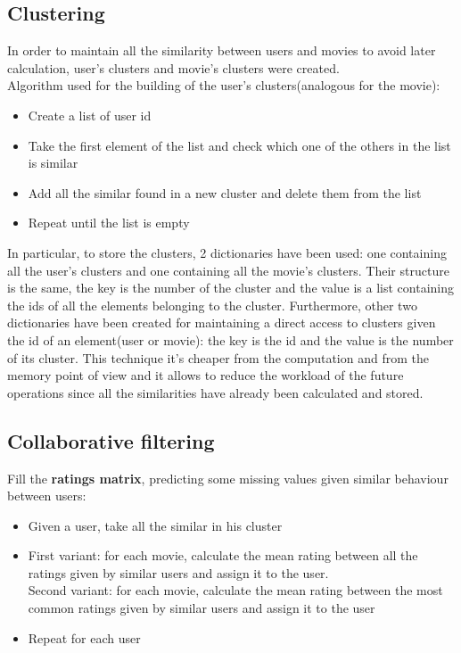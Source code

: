 \documentclass{article}
\begin{document}
\subsection{Clustering}
In order to maintain all the similarity between users and movies to avoid later calculation, user's clusters and movie's clusters were created.\\
Algorithm used for the building of the user's clusters(analogous for the movie):
\begin{itemize}
    \item Create a list of user id
    \item Take the first element of the list and check which one of the others in the list is similar
    \item Add all the similar found in a new cluster and delete them from the list
    \item Repeat until the list is empty
\end{itemize}

\newline
In particular, to store the clusters, 2 dictionaries have been used: one containing all the user's clusters and one containing all the movie's clusters. Their structure is the same, the key is the number of the cluster and the value is a list containing the ids of all the elements belonging to the cluster. Furthermore, other two dictionaries have been created for maintaining a direct access to clusters given the id of an element(user or movie): the key is the id and the value is the number of its cluster. 
\newline
This technique it's cheaper from the computation and from the memory point of view and it allows to reduce the workload of the future operations since all the similarities have already been calculated and stored.


\subsection{Collaborative filtering}
Fill the \textbf{ratings matrix}, predicting some missing values given similar behaviour between users:
\begin{itemize}
    \item Given a user, take all the similar in his cluster
    \item First variant: for each movie, calculate the mean rating between all the ratings given by similar users and assign it to the user.\\
    Second variant: for each movie, calculate the mean rating between the most common ratings given by similar users and assign it to the user
    \item Repeat for each user
\end{itemize}
\end{document}
